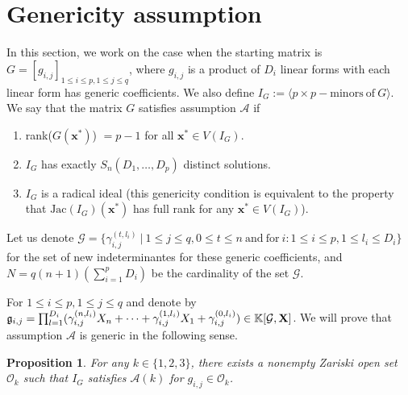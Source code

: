 \documentclass[11pt]{article}
\numberwithin{Property}{section}
\numberwithin{Theorem}{section}
\newtheorem{Proposition}{Proposition}%
\numberwithin{Proposition}{section}
\numberwithin{Lemma}{section}
\numberwithin{Corollary}{section}
\numberwithin{Definition}{section}
\numberwithin{Remark}{section}
\numberwithin{Conjecture}{section}
\numberwithin{Problem}{section}
\numberwithin{Example}{section}
\numberwithin{Claim}{section}
\renewcommand{\leq}{\leqslant}
\newcommand{\field}{\mathbb{K}} %
\begin{document}
\section{Genericity assumption}
In this section, we work on the case when the starting matrix is $G = [g_{i,j}]_{1 \leq i \leq p, 1 \leq j \leq q}$, where $g_{i,j}$ is a product of $D_i$ linear forms with each linear form has generic coefficients. We also define $I_G := \langle p \times p - \mathrm{minors \ of} \ G \rangle$. We say that the matrix $G$ satisfies assumption $\mathcal{A}$ if 
\begin{enumerate}
\item rank($G(\mathbf{x}^*)$) $= p-1$ for all $\mathbf{x}^* \in V(I_G)$.
\item $I_G$ has exactly $S_{n}(D_1, \ldots, D_p)$ distinct solutions.  
\item $I_G$ is a radical ideal (this genericity condition is equivalent to the property that $\mathrm{Jac}(I_G)(\mathbf{x}^*)$ has full rank for any $\mathbf{x}^* \in V(I_G)$). 
\end{enumerate}
Let us denote $\mathcal{G} = \{\gamma_{i,j}^{(t,l_i)} \ | \ 1 \leq j \leq q, 0 \leq t \leq n \ \mathrm{and} \ \mathrm{for} \ i : 1 \leq i \leq p, 1 \leq l_i \leq D_i\}$ for the set of new indeterminantes for these generic coefficients, and $N = q(n+1)(\sum_{i=1}^pD_i)$ be the cardinality of the set $\mathcal{G}$. 

For $1 \leq i \leq p, 1 \leq j \leq q$ and denote by $\mathfrak{g}_{i,j} = \prod_{l=1}^{D_i}(\gamma_{i,j}^{(n,l_i)}X_n + \cdots + \gamma_{i,j}^{(1,l_i)}X_1 + \gamma_{i,j}^{(0,l_i)}) \in \field[\mathcal{G}, \bf{X}]$. We will prove that assumption $\mathcal{A}$ is generic in the following sense. 
\begin{Proposition} For any $k \in \{1,2,3\}$, there exists a nonempty Zariski open set $\mathcal{O}_k$ such that $I_G$ satisfies $\mathcal{A}(k)$ for $g_{i,j} \in \mathcal{O}_k$. 
\end{Proposition}
\end{document}
